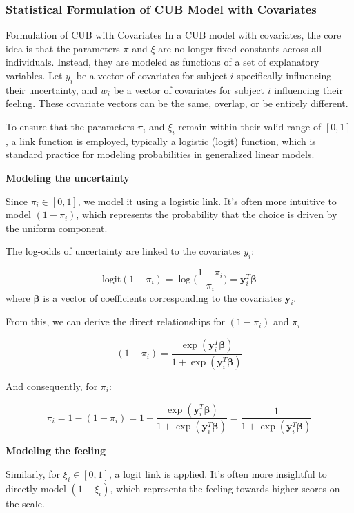 \documentclass[
  letterpaper,
  DIV=11,
  numbers=noendperiod]{scrartcl}
\begin{document}
\hypertarget{statistical-formulation-of-cub-model-with-covariates}{%
\subsubsection{Statistical Formulation of CUB Model with
Covariates}\label{statistical-formulation-of-cub-model-with-covariates}}

Formulation of CUB with Covariates In a CUB model with covariates, the
core idea is that the parameters \(\pi\) and \(\xi\) are no longer fixed
constants across all individuals. Instead, they are modeled as functions
of a set of explanatory variables. Let \(y_i\) be a vector of covariates
for subject \(i\) specifically influencing their uncertainty, and
\(w_i\) be a vector of covariates for subject \(i\) influencing their
feeling. These covariate vectors can be the same, overlap, or be
entirely different.

To ensure that the parameters \(\pi_i\) and \(\xi_i\) remain within
their valid range of \([0,1]\), a link function is employed, typically a
logistic (logit) function, which is standard practice for modeling
probabilities in generalized linear models.

\textbf{Modeling the uncertainty}

Since \(\pi_i\in [0,1]\), we model it using a logistic link. It's often
more intuitive to model \((1-\pi_i)\), which represents the probability
that the choice is driven by the uniform component.

The log-odds of uncertainty are linked to the covariates \(y_i\):

\[
\text{logit}(1-\pi_i) = \log \Bigg(\frac{1-\pi_i}{\pi_i}\Bigg) = \boldsymbol{y}^{T}_i\boldsymbol{\beta}
\] where \(\boldsymbol{\beta}\) is a vector of coefficients
corresponding to the covariates \(\boldsymbol{y}_i\).

From this, we can derive the direct relationships for \((1−\pi_i)\) and
\(\pi_i\)

\[
(1-\pi_i)=\frac{\exp(\boldsymbol{y}^{T}_i\boldsymbol{\beta})}{1+\exp(\boldsymbol{y}^{T}_i\boldsymbol{\beta})}
\]

And consequently, for \(\pi_i\):

\[
\pi_i = 1-(1-\pi_i) = 1- \frac{\exp(\boldsymbol{y}^{T}_i\boldsymbol{\beta})}{1+\exp(\boldsymbol{y}^{T}_i\boldsymbol{\beta})} = \frac{1}{1+\exp(\boldsymbol{y}^{T}_i\boldsymbol{\beta})}
\]

\textbf{Modeling the feeling}

Similarly, for \(\xi_i\in [0,1]\), a logit link is applied. It's often
more insightful to directly model \((1-\xi_i)\), which represents the
feeling towards higher scores on the scale.
\end{document}
